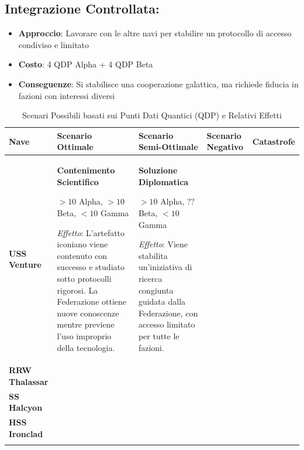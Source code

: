 \documentclass[letterpaper,twocolumn,openany,nodeprecatedcode]{dndbook}
\begin{document}
\subsection{Integrazione Controllata:}

\begin{itemize}
    \item \textbf{Approccio}: Lavorare con le altre navi per stabilire un protocollo di accesso condiviso e limitato
    \item \textbf{Costo}: 4 QDP Alpha + 4 QDP Beta
    \item \textbf{Conseguenze}: Si stabilisce una cooperazione galattica, ma richiede fiducia in fazioni con interessi diversi
\end{itemize}


\begin{landscape}

\begin{table}[htbp]
\centering
\caption{Scenari Possibili basati sui Punti Dati Quantici (QDP) e Relativi Effetti}
\small
\begin{tabular}{|p{2.3cm}|p{4cm}|p{4cm}|p{4cm}|p{4cm}|}
\hline
\textbf{Nave} & \textbf{Scenario Ottimale} & \textbf{Scenario Semi-Ottimale} & \textbf{Scenario Negativo} & \textbf{Catastrofe} \\ 
\hline
\textbf{USS Venture} & 
\textbf{Contenimento Scientifico}

$>10$ Alpha, $>10$ Beta, $<10$ Gamma

\textit{Effetto}: L'artefatto iconiano viene contenuto con successo e studiato sotto protocolli rigorosi. La Federazione ottiene nuove conoscenze mentre previene l'uso improprio della tecnologia.
& 
\textbf{Soluzione Diplomatica}

$>10$ Alpha, ?? Beta, $<10$ Gamma

\textit{Effetto}: Viene stabilita un'iniziativa di ricerca congiunta guidata dalla Federazione, con accesso limitato per tutte le fazioni.
& 

& 

\\ 
\hline
\textbf{RRW Thalassar} & 

& 

& 

& 

\\ 
\hline
\textbf{SS Halcyon} & 

& 

& 

& 

\\ 
\hline
\textbf{HSS Ironclad} & 

& 

& 

& 

\\ 
\hline
\multicolumn{5}{|p{18.3cm}|}{
}\\
\hline
\end{tabular}
\end{table}
\end{landscape}
\end{document}
